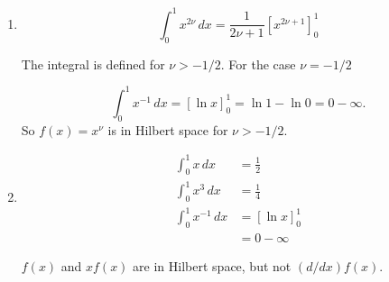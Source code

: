 \documentclass{article}
\begin{document}
\subsection{}

\begin{enumerate}
  \item

        \[\int_0^1 x^{2 \nu} \,d x = \frac{1}{2 \nu + 1} \left[ x^{2 \nu + 1} \right]_0^1\]

        The integral is defined for $\nu > -1 / 2$. For the case $\nu = -1 / 2$

        \[\int_0^1 x^{-1} \,d x = [\ln x]_0^1 = \ln 1 - \ln 0 = 0 - \infty.\] So $f(x) = x^\nu$ is in Hilbert space for $\nu > -1 / 2$.

  \item

        \begin{align*}
          \int_0^1 x \,d x      & = \frac{1}{2} \\
          \int_0^1 x^3 \,d x    & = \frac{1}{4} \\
          \int_0^1 x^{-1} \,d x & = [\ln x]_0^1 \\
                                & = 0 - \infty
        \end{align*}

        $f(x)$ and $x f(x)$ are in Hilbert space, but not $(d / d x) f(x)$.
\end{enumerate}

\setcounter{subsection}{3}
\subsection{}
\end{document}
